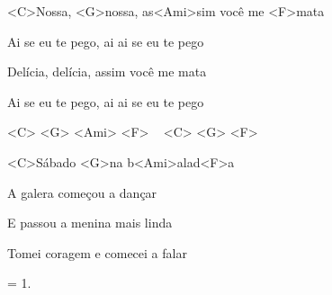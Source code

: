 
\zr

<C>Nossa, <G>nossa,
as<Ami>sim você me <F>mata

Ai se eu te pego,
ai ai se eu te pego

Delícia, delícia,
assim você me mata

Ai se eu te pego,
ai ai se eu te pego
\kr


<C> <G> <Ami> <F> ~ <C> <G> <F>

\zs
<C>Sábado <G>na b<Ami>alad<F>a

A galera começou a dançar

E passou a menina mais linda

Tomei coragem e comecei a falar
\ks

\zr \kr

\zs
= 1.
\ks

\zr \kr

\zr \kr

\kp


